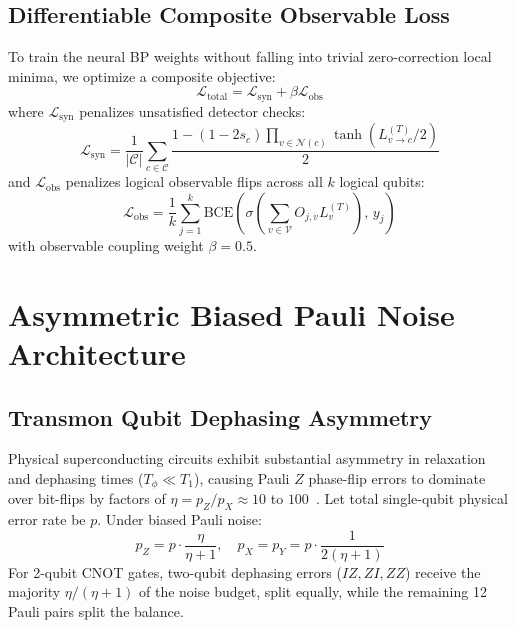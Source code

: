 \documentclass[journal]{IEEEtran}
\begin{document}
\subsection{Differentiable Composite Observable Loss}
To train the neural BP weights without falling into trivial zero-correction local minima, we optimize a composite objective:
\begin{equation}
    \mathcal{L}_{\text{total}} = \mathcal{L}_{\text{syn}} + \beta \mathcal{L}_{\text{obs}}
\end{equation}
where $\mathcal{L}_{\text{syn}}$ penalizes unsatisfied detector checks:
\begin{equation}
    \mathcal{L}_{\text{syn}} = \frac{1}{|\mathcal{C}|} \sum_{c \in \mathcal{C}} \frac{1 - (1 - 2 s_c) \prod_{v \in \mathcal{N}(c)} \tanh(L_{v \to c}^{(T)} / 2)}{2}
\end{equation}
and $\mathcal{L}_{\text{obs}}$ penalizes logical observable flips across all $k$ logical qubits:
\begin{equation}
    \mathcal{L}_{\text{obs}} = \frac{1}{k} \sum_{j=1}^k \text{BCE}\left( \sigma\left( \sum_{v \in \mathcal{V}} O_{j, v} L_v^{(T)} \right), \, y_j \right)
\end{equation}
with observable coupling weight $\beta = 0.5$.

\section{Asymmetric Biased Pauli Noise Architecture}

\subsection{Transmon Qubit Dephasing Asymmetry}
Physical superconducting circuits exhibit substantial asymmetry in relaxation and dephasing times ($T_\phi \ll T_1$), causing Pauli $Z$ phase-flip errors to dominate over bit-flips by factors of $\eta = p_Z / p_X \approx 10$ to $100$~\cite{tuckett2018ultrahigh,aliferis2009fault}.
Let total single-qubit physical error rate be $p$. Under biased Pauli noise:
\begin{equation}
    p_Z = p \cdot \frac{\eta}{\eta + 1}, \quad p_X = p_Y = p \cdot \frac{1}{2(\eta + 1)}
\end{equation}
For 2-qubit CNOT gates, two-qubit dephasing errors ($IZ, ZI, ZZ$) receive the majority $\eta/(\eta+1)$ of the noise budget, split equally, while the remaining 12 Pauli pairs split the balance.
\end{document}
